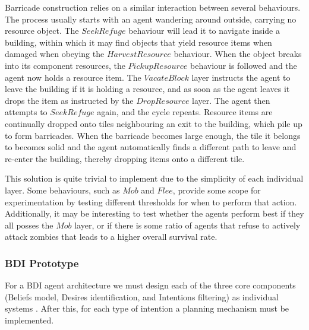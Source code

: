 \documentclass[12pt,a4paper]{article}
\begin{document}
Barricade construction relies on a similar interaction between several behaviours. The process usually starts with an agent wandering around outside, carrying no resource object. The $SeekRefuge$ behaviour will lead it to navigate inside a building, within which it may find objects that yield resource items when damaged when obeying the $HarvestResource$ behaviour. When the object breaks into its component resources, the $PickupResource$ behaviour is followed and the agent now holds a resource item. The $VacateBlock$ layer instructs the agent to leave the building if it is holding a resource, and as soon as the agent leaves it drops the item as instructed by the $DropResource$ layer. The agent then attempts to $SeekRefuge$ again, and the cycle repeats. Resource items are continually dropped onto tiles neighbouring an exit to the building, which pile up to form barricades. When the barricade becomes large enough, the tile it belongs to becomes solid and the agent automatically finds a different path to leave and re-enter the building, thereby dropping items onto a different tile.

This solution is quite trivial to implement due to the simplicity of each individual layer. Some behaviours, such as $Mob$ and $Flee$, provide some scope for experimentation by testing different thresholds for when to perform that action. Additionally, it may be interesting to test whether the agents perform best if they all posses the $Mob$ layer, or if there is some ratio of agents that refuse to actively attack zombies that leads to a higher overall survival rate.

\subsubsection{BDI Prototype}\noindent
For a BDI agent architecture we must design each of the three core components (Beliefs model, Desires identification, and Intentions filtering) as individual systems \cite{rao95}. After this, for each type of intention a planning mechanism must be implemented.
\end{document}
